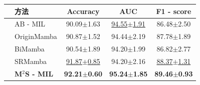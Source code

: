 \begin{table}[h!]
  \large    %
  \centering
  \begin{tabularx}{\textwidth}{clCCC}
    \toprule
    &方法  & Accuracy& AUC&F1 - score\\ \midrule
    &AB - MIL  & 90.09$\pm$1.63 & \underline{94.55$\pm$1.91} & 86.48$\pm$2.50\\
    &OriginMamba        & 90.87$\pm$1.52 & 94.44$\pm$2.19 & 87.78$\pm$1.89\\
    &BiMamba          & 90.54$\pm$1.89 & 94.20$\pm$1.99 & 86.82$\pm$2.77\\
    &SRMamba & \underline{91.87$\pm$0.85} & 94.20$\pm$2.16 & \underline{88.37$\pm$1.31}\\
    &\textbf{M$^2$S - MIL}        & \textbf{92.21$\pm$0.60}     & \textbf{95.24$\pm$1.85}      & \textbf{89.46$\pm$0.93}\\  
    \bottomrule
  \end{tabularx}
  \label{table3: CAMELYON_PLIP}
\end{table}

